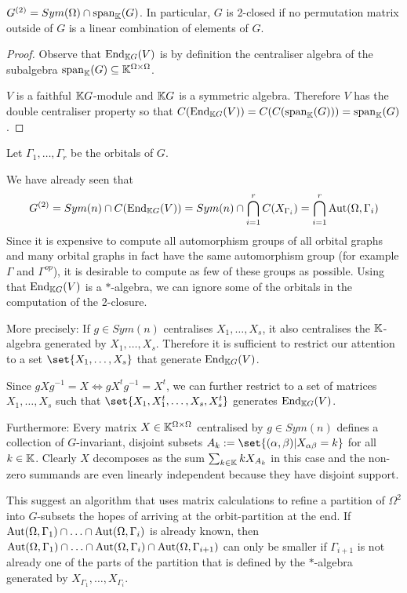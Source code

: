 \documentclass[fontsize=11pt,fleqn,a4paper]{scrartcl}
\begin{document}
\begin{lemma}
$G^{(2)}  = Sym(\Omega)\cap\operatorname{span}_{\mathbb{K}}(G)$.
In particular, $G$ is 2-closed if no permutation matrix outside of $G$ is a linear combination of elements of $G$.
\end{lemma}
\begin{proof}
Observe that $\operatorname{End}_{\mathbb{K} G}(V)$ is by definition the centraliser algebra of the subalgebra $\operatorname{span}_{\mathbb{K}}(G) \subseteq \mathbb{K}^{\Omega\times\Omega}$.

$V$ is a faithful $\mathbb{K} G$-module and $\mathbb{K} G$ is a symmetric algebra. Therefore $V$ has the double centraliser property so that $C(\operatorname{End}_{\mathbb{K} G}(V)) = C(C(\operatorname{span}_{\mathbb{K}}(G))) = \operatorname{span}_{\mathbb{K}}(G)$.
\end{proof}



\begin{remark}
Let $\Gamma_1,\ldots,\Gamma_r$ be the orbitals of $G$.

We have already seen that
\[G^{(2)} = Sym(n) \cap C(\operatorname{End}_{\mathbb{K} G}(V))=Sym(n)\cap \bigcap_{i=1}^r C(X_{\Gamma_i}) = \bigcap_{i=1}^r \operatorname{Aut}(\Omega,\Gamma_i)\]
Since it is expensive to compute all automorphism groups of all orbital graphs and many orbital graphs in fact have the same automorphism group (for example $\Gamma$ and $\Gamma^{op}$), it is desirable to compute as few of these groups as possible. Using that $\operatorname{End}_{\mathbb{K} G}(V)$ is a $\ast$-algebra, we can ignore some of the orbitals in the computation of the 2-closure.

\medbreak
More precisely: If $g\in Sym(n)$ centralises $X_1,\ldots,X_s$, it also centralises the $\mathbb{K}$-algebra generated by $X_1,\ldots,X_s$. Therefore it is sufficient to restrict our attention to a set $\set{X_1,\ldots,X_s}$ that generate $\operatorname{End}_{\mathbb{K} G}(V)$.

Since $gXg^{-1} = X \iff gX^tg^{-1} = X^t$, we can further restrict to a set of matrices $X_1,\ldots,X_s$ such that $\set{X_1,X_1^t, \ldots, X_s, X_s^t}$ generates $\operatorname{End}_{\mathbb{K} G}(V)$.

\medbreak
Furthermore: Every matrix $X\in\mathbb{K}^{\Omega\times\Omega}$ centralised by $g\in Sym(n)$ defines a collection of $G$-invariant, disjoint subsets $A_k := \set{(\alpha,\beta) | X_{\alpha\beta}=k}$ for all $k\in\mathbb{K}$. Clearly $X$ decomposes as the sum $\sum_{k\in\mathbb{K}} kX_{A_k}$ in this case and the non-zero summands are even linearly independent because they have disjoint support.

\medbreak
This suggest an algorithm that uses matrix calculations to refine a partition of $\Omega^2$ into $G$-subsets the hopes of arriving at the orbit-partition at the end. If $\operatorname{Aut}(\Omega,\Gamma_1)\cap\ldots\cap \operatorname{Aut}(\Omega,\Gamma_i)$ is already known, then $\operatorname{Aut}(\Omega,\Gamma_1)\cap\ldots\cap \operatorname{Aut}(\Omega,\Gamma_i)\cap \operatorname{Aut}(\Omega,\Gamma_{i+1})$ can only be smaller if $\Gamma_{i+1}$ is not already one of the parts of the partition that is defined by the $\ast$-algebra generated by $X_{\Gamma_1},\ldots,X_{\Gamma_i}$.
\end{remark}
\end{document}
